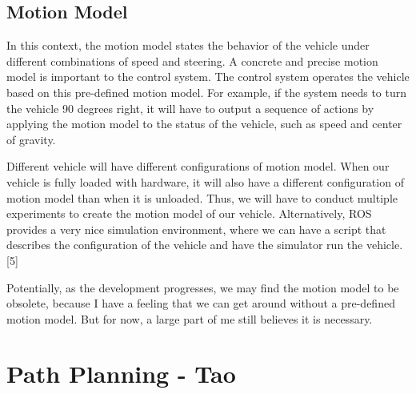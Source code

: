 \documentclass[compsoc,draftclsnofoot,onecolumn,10pt]{IEEEtran}
\begin{document}
\subsection{Motion Model}
In this context, the motion model states the behavior of the vehicle under different 
combinations of speed and steering. A concrete and precise motion model is important to 
the control system. The control system operates the vehicle based on this pre-defined 
motion model. For example, if the system needs to turn the vehicle 90 degrees right, it 
will have to output a sequence of actions by applying the motion model to the status of 
the vehicle, such as speed and center of gravity.\par

Different vehicle will have different configurations of motion model. When our vehicle 
is fully loaded with hardware, it will also have a different configuration of motion 
model than when it is unloaded. Thus, we will have to conduct multiple experiments to 
create the motion model of our vehicle. Alternatively, ROS provides a very nice simulation 
environment, where we can have a script that describes the configuration of the vehicle 
and have the simulator run the vehicle. [5]\par

Potentially, as the development progresses, we may find the motion model to be obsolete, 
because I have a feeling that we can get around without a pre-defined motion model. But 
for now, a large part of me still believes it is necessary.\par

\section{Path Planning - Tao}
\end{document}
